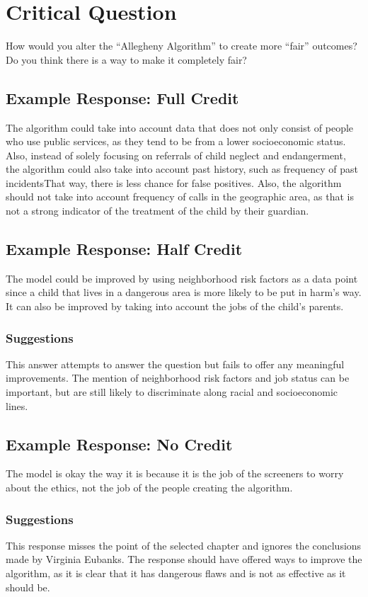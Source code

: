 \documentclass{article}
\begin{document}
\section{Critical Question}
    How would you alter the “Allegheny Algorithm” to create more “fair” outcomes? Do you think there is a way to make it completely fair? 

    \subsection{Example Response: Full Credit}
        The algorithm could take into account data that does not only consist of people who use public services, as they tend to be from a lower socioeconomic status. Also, instead of solely focusing on referrals of child neglect and endangerment, the algorithm could also take into account past history, such as frequency of past incidentsThat way, there is less chance for false positives. Also, the algorithm should not take into account frequency of calls in the geographic area, as that is not a strong indicator of the treatment of the child by their guardian. 

    \subsection{Example Response: Half Credit}
        The model could be improved by using neighborhood risk factors as a data point since a child that lives in a dangerous area is more likely to be put in harm’s way. It can also be improved by taking into account the jobs of the child’s parents.

        \subsubsection{Suggestions}
            This answer attempts to answer the question but fails to offer any meaningful improvements. The mention of neighborhood risk factors and job status can be important, but are still likely to discriminate along racial and socioeconomic lines. 

    \subsection{Example Response: No Credit}
        The model is okay the way it is because it is the job of the screeners to worry about the ethics, not the job of the people creating the algorithm.

        \subsubsection{Suggestions}
            This response misses the point of the selected chapter and ignores the conclusions made by Virginia Eubanks. The response should have offered ways to improve the algorithm, as it is clear that it has dangerous flaws and is not as effective as it should be. 




\end{document}
